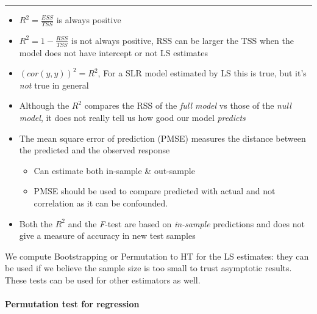 \documentclass[]{article}
\providecommand{\tightlist}{%
  \setlength{\itemsep}{0pt}\setlength{\parskip}{0pt}}
\let\oldparagraph\paragraph
\renewcommand{\paragraph}[1]{\oldparagraph{#1}\mbox{}}
\begin{document}
\begin{center}\rule{0.5\linewidth}{\linethickness}\end{center}

\begin{itemize}
\tightlist
\item
  \(R^2=\frac{ESS}{TSS}\) is always positive
\item
  \(R^2=1-\frac{RSS}{TSS}\) is not always positive, RSS can be larger
  the TSS when the model does not have intercept or not LS estimates
\item
  \((cor(y,\hat{y}))^2=R^2\), For a SLR model estimated by LS this is
  true, but it's \emph{not} true in general
\item
  Although the \(R^2\) compares the RSS of the \emph{full model} vs
  those of the \emph{null model}, it does not really tell us how good
  our model \emph{predicts}\\
\item
  The mean square error of prediction (PMSE) measures the distance
  between the predicted and the observed response

  \begin{itemize}
  \tightlist
  \item
    Can estimate both in-sample \& out-sample\\
  \item
    PMSE should be used to compare predicted with actual and not
    correlation as it can be confounded.\\
  \end{itemize}
\item
  Both the \(R^2\) and the \emph{F}-test are based on \emph{in-sample}
  predictions and does not give a measure of accuracy in new test
  samples
\end{itemize}

We compute Bootstrapping or Permutation to HT for the LS estimates: they
can be used if we believe the sample size is too small to trust
asymptotic results. These tests can be used for other estimators as
well.

\hypertarget{permutation-test-for-regression}{%
\paragraph{Permutation test for
regression}\label{permutation-test-for-regression}}
\end{document}
